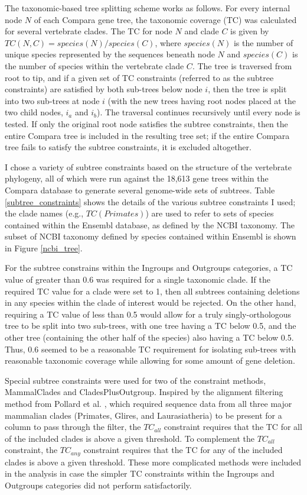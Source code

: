 The taxonomic-based tree splitting scheme works as follows. For every
internal node $N$ of each Compara gene tree, the taxonomic coverage
(TC) was calculated for several vertebrate clades. The TC for node $N$
and clade $C$ is given by $TC(N,C) = species(N) / species(C) $, where
$species(N)$ is the number of unique species represented by the
sequences beneath node $N$ and $species(C)$ is the number of species
within the vertebrate clade $C$. The tree is traversed from root to
tip, and if a given set of TC constraints (referred to as the subtree
constraints) are satisfied by both sub-trees below node $i$, then the
tree is split into two sub-trees at node $i$ (with the new trees
having root nodes placed at the two child nodes, $i_a$ and $i_b$). The
traversal continues recursively until every node is tested. If only
the original root node satisfies the subtree constraints, then the
entire Compara tree is included in the resulting tree set; if the
entire Compara tree fails to satisfy the subtree constraints, it is
excluded altogether.

I chose a variety of subtree constraints based on the structure of the
vertebrate phylogeny, all of which were run against the 18,613 gene
trees within the Compara database to generate several genome-wide sets
of subtrees. Table \ref{subtree_constraints} shows the details of the
various subtree constraints I used; the clade names (e.g.,
$TC(Primates)$) are used to refer to sets of species contained within
the Ensembl database, as defined by the NCBI taxonomy. The subset of
NCBI taxonomy defined by species contained within Ensembl is shown in
Figure \ref{ncbi_tree}.

For the subtree constrains within the Ingroups and Outgroups
categories, a TC value of greater than 0.6 was required for a single
taxonomic clade. If the required TC value for a clade were set to 1,
then all subtrees containing deletions in any species within the clade
of interest would be rejected. On the other hand, requiring a TC value
of less than 0.5 would allow for a truly singly-orthologous tree to be
split into two sub-trees, with one tree having a TC below 0.5, and the
other tree (containing the other half of the species) also having a TC
below 0.5. Thus, 0.6 seemed to be a reasonable TC requirement for
isolating sub-trees with reasonable taxonomic coverage while allowing
for some amount of gene deletion.

Special subtree constraints were used for two of the constraint
methods, MammalClades and CladesPlusOutgroup. Inspired by the
alignment filtering method from Pollard et al. \citeyearpar{TODO},
which required sequence data from all three major mammalian clades
(Primates, Glires, and Laurasiatheria) to be present for a column to
pass through the filter, the $TC_{all}$ constraint requires that the
TC for all of the included clades is above a given threshold. To
complement the $TC_{all}$ constraint, the $TC_{any}$ constraint
requires that the TC for any of the included clades is above a given
threshold. These more complicated methods were included in the
analysis in case the simpler TC constraints within the Ingroups and
Outgroups categories did not perform satisfactorily.

